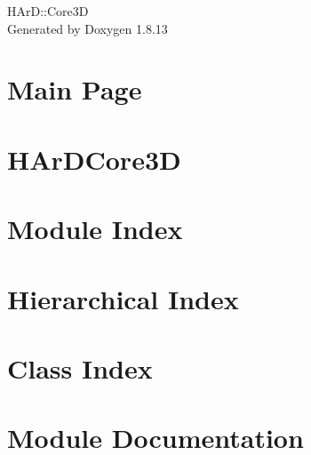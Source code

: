 \documentclass[twoside]{book}
\newcommand{\+}{\discretionary{\mbox{\scriptsize$\hookleftarrow$}}{}{}}
\newcommand{\clearemptydoublepage}{%
  \newpage{\pagestyle{empty}\cleardoublepage}%
}
\begin{document}
\hypersetup{pageanchor=false,
             bookmarksnumbered=true,
             pdfencoding=unicode
            }
\begin{titlepage}
\vspace*{7cm}
\begin{center}%
{\Large H\+ArD\+:\+:Core3D }\\
\vspace*{1cm}
{\large Generated by Doxygen 1.8.13}\\
\end{center}
\end{titlepage}
\clearemptydoublepage
{}
\tableofcontents
\clearemptydoublepage
{}
\hypersetup{pageanchor=true}

\chapter{Main Page}
\label{index}\hypertarget{index}{}
\chapter{H\+Ar\+D\+Core3D}
\label{md_README}

\chapter{Module Index}

\chapter{Hierarchical Index}

\chapter{Class Index}

\chapter{Module Documentation}








\end{document}
